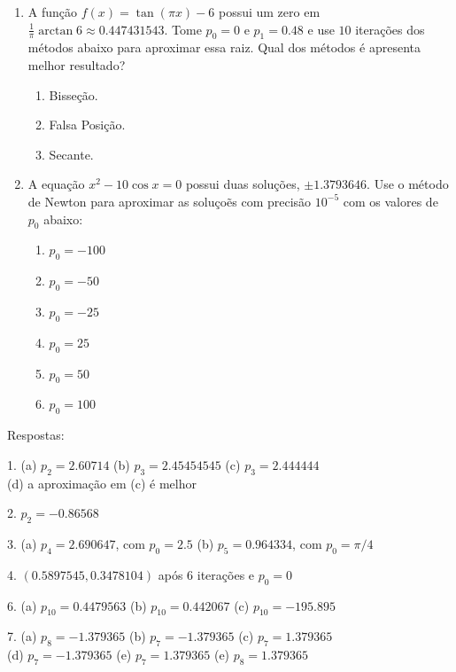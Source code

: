 \documentclass{article}
\begin{document}
\begin{enumerate}
	\item A fun\c{c}\~ao $f(x) = \tan(\pi x) - 6$ possui um zero em
		$\frac{1}{\pi}\arctan{6}\approx{}0.447431543$. Tome $p_0 = 0$ e $p_1 =
		0.48$ e use $10$ itera\c{c}\~oes dos m\'etodos abaixo para aproximar essa raiz.
		Qual dos m\'etodos \'e apresenta melhor resultado?
		\begin{enumerate}
			\item Bisse\c{c}\~ao.
			\item Falsa Posi\c{c}\~ao.
			\item Secante.
		\end{enumerate}

	\item A equa\c{c}\~ao $x^2-10\cos{x} = 0$ possui duas solu\c{c}\~oes, $\pm1.3793646$.
		Use o m\'etodo de Newton para aproximar as solu\c{c}oẽs com precis\~ao
		$10^{-5}$ com os valores de $p_0$ abaixo:
		\begin{enumerate}
			\item $p_0=-100$
			\item $p_0=-50$
			\item $p_0=-25$
			\item $p_0=25$
			\item $p_0=50$
			\item $p_0=100$
		\end{enumerate}
\end{enumerate}

Respostas:

\noindent{}1. (a) $p_2=2.60714$ (b) $p_3=2.45454545$ (c) $p_3=2.444444$ \\
(d) a aproxima\c{c}\~ao em (c) \'e melhor

\noindent{}2. $p_2=-0.86568$

\noindent{}3. (a) $p_4=2.690647$, com $p_0=2.5$ (b) $p_5=0.964334$, com $p_0=\pi/4$

\noindent{}4. $(0.5897545, 0.3478104)$ ap\'os $6$ itera\c{c}\~oes e $p_0=0$

\noindent{}6. (a) $p_{10}=0.4479563$ (b) $p_{10}=0.442067$ (c) $p_{10} = -195.895$

\noindent{}7. (a) $p_8=-1.379365$ (b) $p_7=-1.379365$ (c) $p_7=1.379365$ \\
(d) $p_7=-1.379365$ (e) $p_7=1.379365$ (e) $p_8=1.379365$
\end{document}
